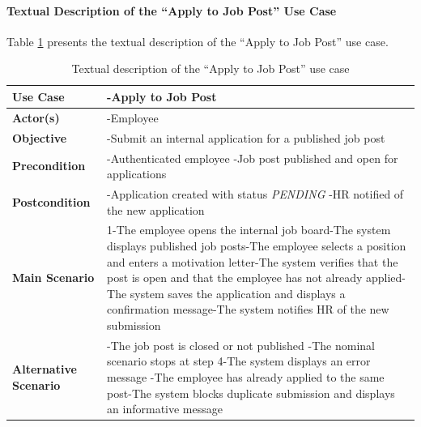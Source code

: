 \paragraph{Textual Description of the ``Apply to Job Post'' Use Case}
Table \ref{tab:apply-job} presents the textual description of the ``Apply to Job Post'' use case.

\begin{table}[H]
\centering
\caption{Textual description of the ``Apply to Job Post'' use case}
\label{tab:apply-job}
\begin{tabular}{|p{}|p{}|}
    \hline
   \textbf{Use Case} & -Apply to Job Post \\
    \hline
    \textbf{Actor(s)} & -Employee \\
    \hline
    \textbf{Objective} & -Submit an internal application for a published job post \\
    \hline
    \textbf{Precondition} & -Authenticated employee\newline
-Job post published and open for applications \\
    \hline
    \textbf{Postcondition} & -Application created with status \textit{PENDING}\newline
-HR notified of the new application \\
    \hline
    \textbf{Main Scenario}
    & 1-The employee opens the internal job board\newline
2-The system displays published job posts\newline
3-The employee selects a position and enters a motivation letter\newline
4-The system verifies that the post is open and that the employee has not already applied\newline
5-The system saves the application and displays a confirmation message\newline
6-The system notifies HR of the new submission \\ \hline
    \textbf{Alternative Scenario}
    & -The job post is closed or not published\newline
-The nominal scenario stops at step 4\newline
1-The system displays an error message\newline
\newline
-The employee has already applied to the same post\newline
1-The system blocks duplicate submission and displays an informative message \\ \hline
\end{tabular}
\end{table}

